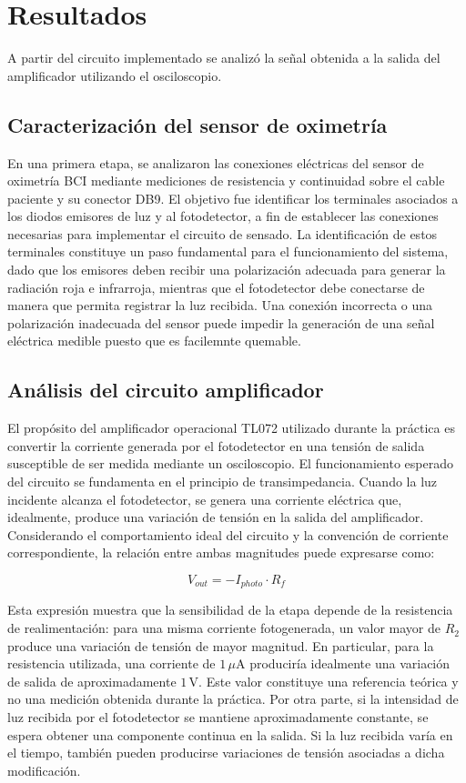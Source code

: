 \section{Resultados}

A partir del circuito implementado se analizó la señal obtenida a la salida del amplificador utilizando el osciloscopio.

\subsection{Caracterización del sensor de oximetría}
En una primera etapa, se analizaron las conexiones eléctricas del sensor de oximetría BCI mediante mediciones de resistencia y continuidad sobre el cable paciente y su conector DB9. El objetivo fue identificar los terminales asociados a los diodos emisores de luz y al fotodetector, a fin de establecer las conexiones necesarias para implementar el circuito de sensado.
La identificación de estos terminales constituye un paso fundamental para el funcionamiento del sistema, dado que los emisores deben recibir una polarización adecuada para generar la radiación roja e infrarroja, mientras que el fotodetector debe conectarse de manera que permita registrar la luz recibida. Una conexión incorrecta o una polarización inadecuada del sensor puede impedir la generación de una señal eléctrica medible puesto que es facilemnte quemable.

\subsection{Análisis del circuito amplificador}
El propósito del amplificador operacional TL072 utilizado durante la práctica es convertir la corriente generada por el fotodetector en una tensión de salida susceptible de ser medida mediante un osciloscopio.
El funcionamiento esperado del circuito se fundamenta en el principio de transimpedancia. Cuando la luz incidente alcanza el fotodetector, se genera una corriente eléctrica que, idealmente, produce una variación de tensión en la salida del amplificador. Considerando el comportamiento ideal del circuito y la convención de corriente correspondiente, la relación entre ambas magnitudes puede expresarse como:

\begin{equation}
V_{out} = -I_{photo} \cdot R_f
\end{equation}

Esta expresión muestra que la sensibilidad de la etapa depende de la resistencia de realimentación: para una misma corriente fotogenerada, un valor mayor de \(R_2\) produce una variación de tensión de mayor magnitud. En particular, para la resistencia utilizada, una corriente de \(1\,\mu\text{A}\) produciría idealmente una variación de salida de aproximadamente \(1\,\text{V}\). Este valor constituye una referencia teórica y no una medición obtenida durante la práctica.
Por otra parte, si la intensidad de luz recibida por el fotodetector se mantiene aproximadamente constante, se espera obtener una componente continua en la salida. Si la luz recibida varía en el tiempo, también pueden producirse variaciones de tensión asociadas a dicha modificación. 

